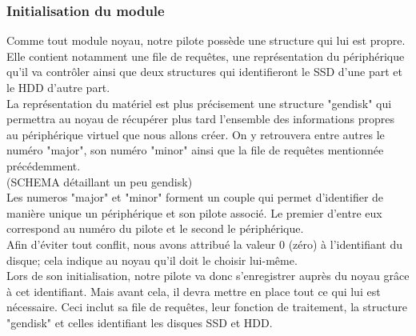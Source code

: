 \documentclass[a4paper,10pt]{article}
\begin{document}
\subsubsection{Initialisation du module}
Comme tout module noyau, notre pilote possède une structure qui lui est propre. Elle contient notamment une file de requêtes, une représentation du 
périphérique qu'il va contrôler ainsi que deux structures qui identifieront le SSD d'une part et le HDD d'autre part.\medskip\\
La représentation du matériel est plus précisement une structure "gendisk" qui permettra au noyau de récupérer plus tard l'ensemble des informations propres 
au périphérique virtuel que nous allons créer. On y retrouvera entre autres le numéro "major", son numéro "minor" ainsi que la file de requêtes mentionnée 
précédemment.\\
    (SCHEMA détaillant un peu gendisk)
\bigskip\\
Les numeros "major" et "minor" forment un couple qui permet d'identifier de manière unique un périphérique et son pilote associé. Le premier d'entre eux 
correspond au numéro du pilote et le second le périphérique.\medskip\\
Afin d'éviter tout conflit, nous avons attribué la valeur 0 (zéro) à l'identifiant du disque; cela indique au noyau qu'il doit le choisir lui-même.
\medskip\\
Lors de son initialisation, notre pilote va donc s'enregistrer auprès du noyau grâce à cet identifiant. Mais avant cela, il devra mettre en place tout ce qui 
lui est nécessaire. Ceci inclut sa file de requêtes, leur fonction de traitement, la structure "gendisk" et celles identifiant les disques SSD et HDD.
\end{document}
